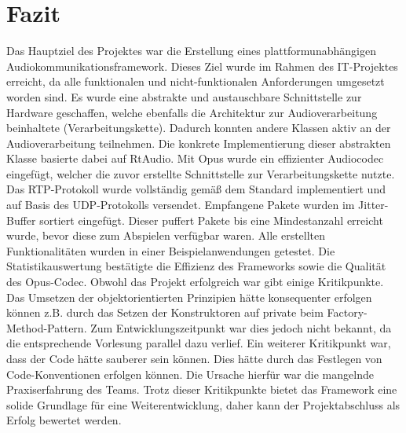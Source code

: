 \section{Fazit}
Das Hauptziel des Projektes war die Erstellung eines plattformunabhängigen Audiokommunikationsframework. Dieses Ziel wurde im Rahmen des IT-Projektes erreicht, da alle funktionalen und nicht-funktionalen Anforderungen umgesetzt worden sind.
Es wurde eine abstrakte und austauschbare Schnittstelle zur Hardware geschaffen, welche ebenfalls die Architektur zur Audioverarbeitung beinhaltete (Verarbeitungskette). Dadurch konnten andere Klassen aktiv an der Audioverarbeitung teilnehmen. Die konkrete Implementierung dieser abstrakten Klasse basierte dabei auf RtAudio.
Mit Opus wurde ein effizienter Audiocodec eingefügt, welcher die zuvor erstellte Schnittstelle zur Verarbeitungskette nutzte. Das RTP-Protokoll wurde vollständig gemäß dem Standard implementiert und auf Basis des UDP-Protokolls versendet. Empfangene Pakete wurden im Jitter-Buffer sortiert eingefügt. Dieser puffert Pakete bis eine Mindestanzahl erreicht wurde, bevor diese zum Abspielen verfügbar waren. Alle erstellten Funktionalitäten wurden in einer Beispielanwendungen getestet. Die Statistikauswertung bestätigte die Effizienz des Frameworks sowie die Qualität des Opus-Codec. Obwohl das Projekt erfolgreich war gibt einige Kritikpunkte. Das Umsetzen der objektorientierten Prinzipien hätte konsequenter erfolgen können z.B. durch das Setzen der Konstruktoren auf private beim Factory-Method-Pattern. Zum Entwicklungszeitpunkt war dies jedoch nicht bekannt, da die entsprechende Vorlesung parallel dazu verlief. Ein weiterer Kritikpunkt war, dass der Code hätte sauberer sein können. Dies hätte durch das Festlegen von Code-Konventionen erfolgen können. Die Ursache hierfür war die mangelnde Praxiserfahrung des Teams. Trotz dieser Kritikpunkte bietet das Framework eine solide Grundlage für eine Weiterentwicklung, daher kann der Projektabschluss als Erfolg bewertet werden. 


